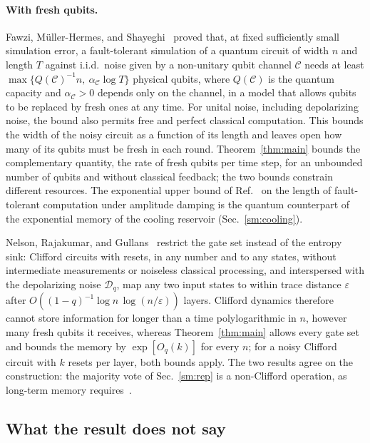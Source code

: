\documentclass[aps,prl,twocolumn,superscriptaddress,floatfix]{revtex4-2}
\theoremstyle{plain}
\newcommand{\cD}{\mathcal D}
\begin{document}
\paragraph*{With fresh qubits.} Fawzi, M\"uller-Hermes, and Shayeghi~\cite{Fawzi2022} proved that, at fixed sufficiently small simulation error, a fault-tolerant simulation of a quantum circuit of width $n$ and length $T$ against i.i.d.\ noise given by a non-unitary qubit channel $\mathcal C$ needs at least $\max\{Q(\mathcal C)^{-1}n,\ \alpha_{\mathcal C}\log T\}$ physical qubits, where $Q(\mathcal C)$ is the quantum capacity and $\alpha_{\mathcal C}>0$ depends only on the channel, in a model that allows qubits to be replaced by fresh ones at any time. For unital noise, including depolarizing noise, the bound also permits free and perfect classical computation. This bounds the width of the noisy circuit as a function of its length and leaves open how many of its qubits must be fresh in each round. Theorem~\ref{thm:main} bounds the complementary quantity, the rate of fresh qubits per time step, for an unbounded number of qubits and without classical feedback; the two bounds constrain different resources. The exponential upper bound of Ref.~\cite{Fawzi2022} on the length of fault-tolerant computation under amplitude damping is the quantum counterpart of the exponential memory of the cooling reservoir (Sec.~\ref{sm:cooling}).

Nelson, Rajakumar, and Gullans~\cite{Nelson2026} restrict the gate set instead of the entropy sink: Clifford circuits with resets, in any number and to any states, without intermediate measurements or noiseless classical processing, and interspersed with the depolarizing noise $\cD_q$, map any two input states to within trace distance $\varepsilon$ after $O((1-q)^{-1}\log n\,\log(n/\varepsilon))$ layers. Clifford dynamics therefore cannot store information for longer than a time polylogarithmic in $n$, however many fresh qubits it receives, whereas Theorem~\ref{thm:main} allows every gate set and bounds the memory by $\exp[O_q(k)]$ for every $n$; for a noisy Clifford circuit with $k$ resets per layer, both bounds apply. The two results agree on the construction: the majority vote of Sec.~\ref{sm:rep} is a non-Clifford operation, as long-term memory requires~\cite{Nelson2026}.

\subsection{What the result does not say}
\end{document}
